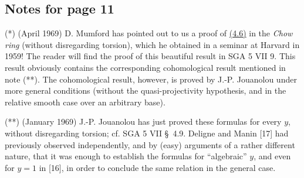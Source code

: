 \subsection*{Notes for page 11}

\noindent(*) (April 1969) D. Mumford has pointed out to us a proof of
\hyperlink{sga6.e14.para.4-6}{(4.6)}
in the \emph{Chow ring} (without disregarding torsion), which he obtained in
a seminar at Harvard in 1959! The reader will find the proof of this
beautiful result in SGA 5 VII 9. This result obviously contains the
corresponding cohomological result mentioned in note (**). The cohomological
result, however, is proved by J.-P. Jouanolou under more general conditions
(without the quasi-projectivity hypothesis, and in the relative smooth case over
an arbitrary base).

\medskip

\noindent(**) (January 1969) J.-P. Jouanolou has just proved these formulas
for every $y$, without disregarding torsion; cf. SGA 5 VII \S~4.9. Deligne
and Manin [17] had previously observed independently, and by (easy)
arguments of a rather different nature, that it was enough to establish the
formulas for ``algebraic'' $y$, and even for $y=1$ in [16], in order to
conclude the same relation in the general case.
